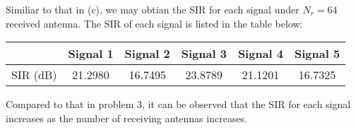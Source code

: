 Similiar to that in (c), we may obtian the SIR for each signal under $N_r = 64$ received antenna.
The SIR of each signal is listed in the table below:
\begin{table}[H]
    \centering
    \begin{tabular}{c|c|c|c|c|c}
        & Signal 1 & Signal 2 & Signal 3 & Signal 4 & Signal 5 \\  
             \hline 
    SIR (dB) & 21.2980  & 16.7495  & 23.8789  & 21.1201  & 16.7325  
    \end{tabular}
\end{table}
Compared to that in problem 3, it can be observed that the SIR for 
each signal increases as the number of receiving antennas increases.